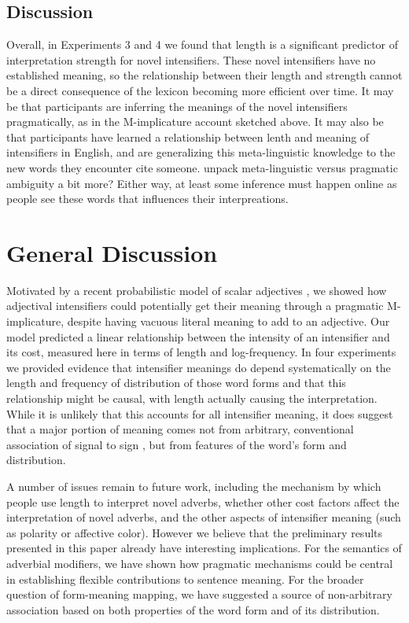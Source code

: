 \documentclass[10pt,letterpaper]{article}
\newcommand{\todo}[1]{{\color{red}#1}}
\begin{document}
\subsection{Discussion}
Overall, in Experiments 3 and 4 we found that length is a significant predictor of interpretation strength for novel intensifiers. These novel intensifiers have no established meaning, so the relationship between their length and strength cannot be a direct consequence of the lexicon becoming more efficient over time. It may be that participants are inferring the meanings of the novel intensifiers pragmatically, as in the M-implicature account sketched above. It may also be that participants have learned a relationship between lenth and meaning of intensifiers in English, and are generalizing this meta-linguistic knowledge to the new words they encounter \todo{cite someone}. \todo{unpack meta-linguistic versus pragmatic ambiguity a bit more?} Either way, at least some inference must happen online as people see these words that influences their interpreations.

\section{General Discussion}

Motivated by a recent probabilistic model of scalar adjectives \cite{lassiter}, we showed how adjectival intensifiers could potentially get their meaning through a pragmatic M-implicature, despite having vacuous literal meaning to add to an adjective. Our model predicted a linear relationship between the intensity of an intensifier and its cost, measured here in terms of length and log-frequency.
In four experiments we provided evidence that intensifier meanings do depend systematically on the length and frequency of distribution of those word forms and that this relationship might be causal, with length actually causing the interpretation.
While it is unlikely that this accounts for all intensifier meaning, it does suggest that a major portion of meaning comes not from arbitrary, conventional association of signal to sign \cite{saussure}, but from features of the word's form and distribution.%

A number of issues remain to future work, including the mechanism by which people use length to interpret novel adverbs, whether other cost factors affect the interpretation of novel adverbs, and the other aspects of intensifier meaning (such as polarity or affective color).
However we believe that the preliminary results presented in this paper already have interesting implications. 
For the semantics of adverbial modifiers, we have shown how pragmatic mechanisms could be central in establishing flexible contributions to sentence meaning.
For the broader question of form-meaning mapping, we have suggested a source of non-arbitrary association based on both properties of the word form and of its distribution.
\end{document}
